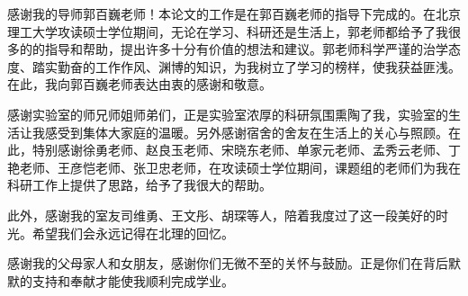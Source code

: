 

\begin{thanks}


感谢我的导师郭百巍老师！本论文的工作是在郭百巍老师的指导下完成的。在北京理工大学攻读硕士学位期间，无论在学习、科研还是生活上，郭老师都给予了我很多的的指导和帮助，提出许多十分有价值的想法和建议。郭老师科学严谨的治学态度、踏实勤奋的工作作风、渊博的知识，为我树立了学习的榜样，使我获益匪浅。在此，我向郭百巍老师表达由衷的感谢和敬意。

感谢实验室的师兄师姐师弟们，正是实验室浓厚的科研氛围熏陶了我，实验室的生活让我感受到集体大家庭的温暖。另外感谢宿舍的舍友在生活上的关心与照顾。在此，特别感谢徐勇老师、赵良玉老师、宋晓东老师、单家元老师、孟秀云老师、丁艳老师、王彦恺老师、张卫忠老师，在攻读硕士学位期间，课题组的老师们为我在科研工作上提供了思路，给予了我很大的帮助。

此外，感谢我的室友司维勇、王文彤、胡琛等人，陪着我度过了这一段美好的时光。希望我们会永远记得在北理的回忆。

感谢我的父母家人和女朋友，感谢你们无微不至的关怀与鼓励。正是你们在背后默默的支持和奉献才能使我顺利完成学业。


\end{thanks}

